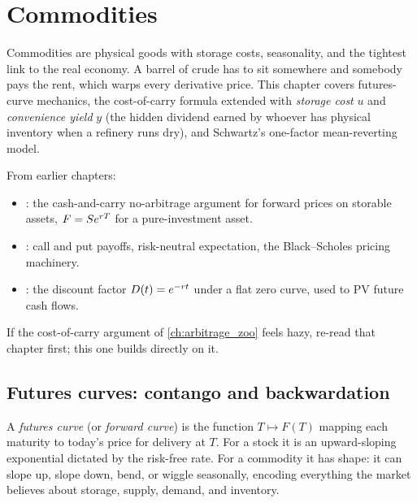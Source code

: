 \chapter{Commodities}
\label{ch:commodities}

Commodities are physical goods with storage costs, seasonality, and
the tightest link to the real economy.  A barrel of crude has to sit
somewhere and somebody pays the rent, which warps every derivative
price.  This chapter covers futures-curve mechanics, the
cost-of-carry formula extended with \emph{storage cost} $u$ and
\emph{convenience yield} $y$ (the hidden dividend earned by whoever
has physical inventory when a refinery runs dry), and Schwartz's
one-factor mean-reverting model.

\begin{backgroundbox}[Prerequisites]
From earlier chapters:
\begin{itemize}
  \item {}: the cash-and-carry no-arbitrage
    argument for forward prices on storable assets, $F = S e^{r T}$
    for a pure-investment asset.
  \item {}: call and put payoffs, risk-neutral
    expectation, the Black--Scholes pricing machinery.
  \item {}: the discount factor
    $D(t) = e^{-r t}$ under a flat zero curve, used to PV future
    cash flows.
\end{itemize}
If the cost-of-carry argument of \cref{ch:arbitrage_zoo} feels
hazy, re-read that chapter first; this one builds directly on it.
\end{backgroundbox}


\section{Futures curves: contango and backwardation}
\label{sec:contango_backwardation}

A \emph{futures curve} (or \emph{forward curve}) is the function
$T \mapsto F(T)$ mapping each maturity to today's price for delivery
at $T$.  For a stock it is an upward-sloping exponential dictated by
the risk-free rate.  For a commodity it has shape: it can slope up,
slope down, bend, or wiggle seasonally, encoding everything the
market believes about storage, supply, demand, and inventory.

